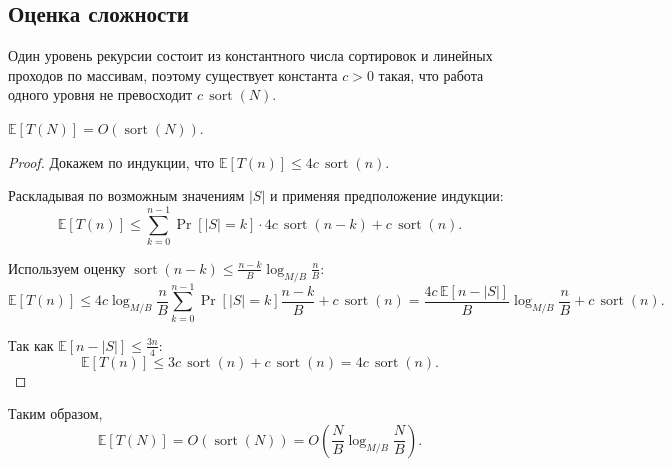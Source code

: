 \subsection{Оценка сложности}

Один уровень рекурсии состоит из константного числа сортировок и линейных проходов по массивам, поэтому существует константа $c > 0$ такая, что работа одного уровня не превосходит $c\,\operatorname{sort}(N)$.

\begin{Theorem}{}{}
	$\mathbb{E}[T(N)] = O(\operatorname{sort}(N))$.
\end{Theorem}

\begin{proof}
	Докажем по индукции, что $\mathbb{E}[T(n)] \le 4c\,\operatorname{sort}(n)$.
	
	Раскладывая по возможным значениям $|S|$ и применяя предположение индукции:
	\[
	\mathbb{E}[T(n)]
	\le
	\sum_{k=0}^{n-1} \Pr[|S|=k]\cdot 4c\,\operatorname{sort}(n-k) + c\,\operatorname{sort}(n).
	\]
	
	Используем оценку $\operatorname{sort}(n-k) \le \frac{n-k}{B}\log_{M/B}\frac{n}{B}$:
	\[
	\mathbb{E}[T(n)]
	\le
	4c\log_{M/B}\frac{n}{B} \sum_{k=0}^{n-1} \Pr[|S|=k]\frac{n-k}{B}
	+ c\,\operatorname{sort}(n)
	=
	\frac{4c\,\mathbb{E}[n-|S|]}{B}\log_{M/B}\frac{n}{B}
	+ c\,\operatorname{sort}(n).
	\]
	
	Так как $\mathbb{E}[n - |S|] \le \frac{3n}{4}$:
	\[
	\mathbb{E}[T(n)]
	\le
	3c\,\operatorname{sort}(n) + c\,\operatorname{sort}(n)
	= 4c\,\operatorname{sort}(n).
	\]
\end{proof}

Таким образом,
\[
\mathbb{E}[T(N)] = O(\operatorname{sort}(N))
= O\!\left(\frac{N}{B}\log_{M/B}\frac{N}{B}\right).
\]